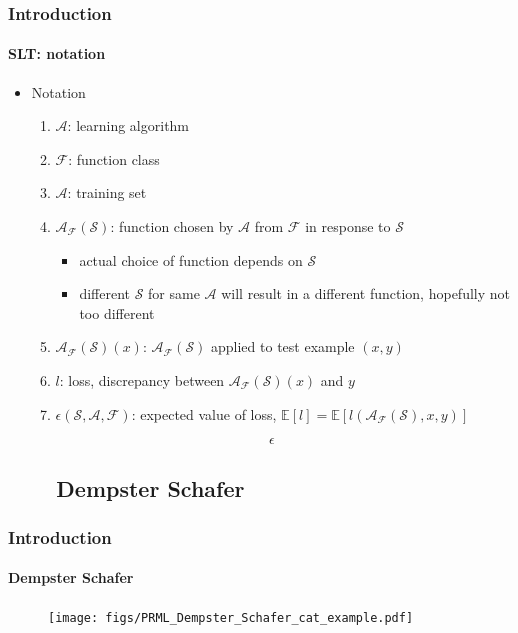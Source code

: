 \begin{frame}
\frametitle{Introduction}
\framesubtitle{SLT: notation}
\logoCSIPCPL\mypagenum
	\begin{itemize}
		\item Notation
			\begin{enumerate}
				\item {\color{red}$\mathcal{A}$}: learning algorithm 
				\item {\color{red}$\mathcal{F}$}: function class
				\item {\color{red}$\mathcal{A}$}: training set
				\item {\color{red}$\mathcal{A_\mathcal{F}(\mathcal{S})}$}: function chosen by $\mathcal{A}$ from $\mathcal{F}$ in response to $\mathcal{S}$
					\begin{itemize}
						\item actual choice of function depends on $\mathcal{S}$
						\item different $\mathcal{S}$ for same $\mathcal{A}$ will result in a different function, hopefully not too different
					\end{itemize}
				\item {\color{red}$\mathcal{A_\mathcal{F}(\mathcal{S})}(x)$}: $\mathcal{A_\mathcal{F}(\mathcal{S})}$ applied to test example $(x, y)$
				\item {\color{red}$l$}: loss, discrepancy between $\mathcal{A_\mathcal{F}(\mathcal{S})}(x)$ and $y$
				\item {\color{red}$\epsilon(\mathcal{S,A,F})$}: expected value of loss, $\mathbb{E}[l] =  \mathbb{E}[l(\mathcal{A_\mathcal{F}(\mathcal{S})}, x, y)]$
			\end{enumerate}
		\begin{equation*} 
			\epsilon
		\end{equation*}
	\end{itemize}
\end{frame}


\subsection{\ \ \ \ Dempster Schafer}
\begin{frame}
\frametitle{Introduction}
\framesubtitle{Dempster Schafer}
\logoCSIPCPL\mypagenum
	\begin{figure}				
		\texttt{[image: figs/PRML\_Dempster\_Schafer\_cat\_example.pdf]}
	\end{figure}
\end{frame}


